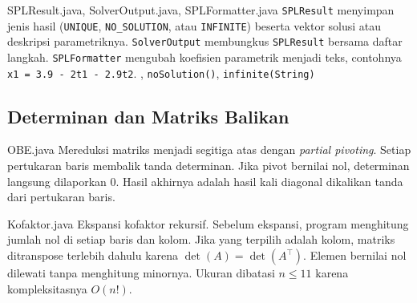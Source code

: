 \begin{kelas}{SPLResult.java, SolverOutput.java, SPLFormatter.java}
\texttt{SPLResult} menyimpan jenis hasil (\texttt{UNIQUE}, \texttt{NO\_SOLUTION}, atau \texttt{INFINITE}) beserta vektor solusi atau deskripsi parametriknya. \texttt{SolverOutput} membungkus \texttt{SPLResult} bersama daftar langkah. \texttt{SPLFormatter} mengubah koefisien parametrik menjadi teks, contohnya \texttt{x1 = 3.9 - 2t1 - 2.9t2}.
, \texttt{noSolution()}, \texttt{infinite(String)}
\end{kelas}

\subsection{Determinan dan Matriks Balikan}

\begin{kelas}{OBE.java}
Mereduksi matriks menjadi segitiga atas dengan \textit{partial pivoting}. Setiap pertukaran baris membalik tanda determinan. Jika pivot bernilai nol, determinan langsung dilaporkan 0. Hasil akhirnya adalah hasil kali diagonal dikalikan tanda dari pertukaran baris.
 
 
\end{kelas}

\begin{kelas}{Kofaktor.java}
Ekspansi kofaktor rekursif. Sebelum ekspansi, program menghitung jumlah nol di setiap baris dan kolom. Jika yang terpilih adalah kolom, matriks ditranspose terlebih dahulu karena $\det(A) = \det(A^{\top})$. Elemen bernilai nol dilewati tanpa menghitung minornya. Ukuran dibatasi $n \le 11$ karena kompleksitasnya $O(n!)$.
 
\end{kelas}

